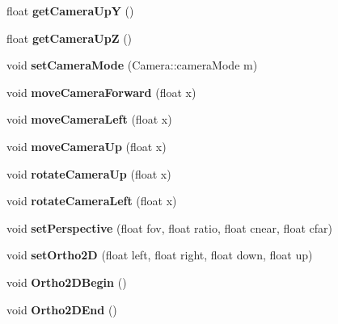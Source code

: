 \begin{DoxyCompactItemize}
\item 
\hypertarget{class_render_engine_a23f3d39a74df6bdea9f133746af82a9c}{float {\bfseries get\-Camera\-Up\-Y} ()}\label{class_render_engine_a23f3d39a74df6bdea9f133746af82a9c}

\item 
\hypertarget{class_render_engine_a0e46e46650506b8972038e032835b39b}{float {\bfseries get\-Camera\-Up\-Z} ()}\label{class_render_engine_a0e46e46650506b8972038e032835b39b}

\item 
\hypertarget{class_render_engine_a4b3a40de0970e9436210076fdfb6eda0}{void {\bfseries set\-Camera\-Mode} (Camera\-::camera\-Mode m)}\label{class_render_engine_a4b3a40de0970e9436210076fdfb6eda0}

\item 
\hypertarget{class_render_engine_a80c1ba74da94aa68ea3b262f16dbcfbe}{void {\bfseries move\-Camera\-Forward} (float x)}\label{class_render_engine_a80c1ba74da94aa68ea3b262f16dbcfbe}

\item 
\hypertarget{class_render_engine_add9933a517cc6899cc47edb376675c18}{void {\bfseries move\-Camera\-Left} (float x)}\label{class_render_engine_add9933a517cc6899cc47edb376675c18}

\item 
\hypertarget{class_render_engine_ac5708ab17601842d4c1740ffffb1efc1}{void {\bfseries move\-Camera\-Up} (float x)}\label{class_render_engine_ac5708ab17601842d4c1740ffffb1efc1}

\item 
\hypertarget{class_render_engine_ab59b72e8484098100cb81a8a10eb1f46}{void {\bfseries rotate\-Camera\-Up} (float x)}\label{class_render_engine_ab59b72e8484098100cb81a8a10eb1f46}

\item 
\hypertarget{class_render_engine_aab2507d056198b6c0a1cdce8052c8c7e}{void {\bfseries rotate\-Camera\-Left} (float x)}\label{class_render_engine_aab2507d056198b6c0a1cdce8052c8c7e}

\item 
\hypertarget{class_render_engine_ab56b031101cd39b934e8a2a1bf1bb578}{void {\bfseries set\-Perspective} (float fov, float ratio, float cnear, float cfar)}\label{class_render_engine_ab56b031101cd39b934e8a2a1bf1bb578}

\item 
\hypertarget{class_render_engine_a93628cf3d21428f0f6562727335e67fc}{void {\bfseries set\-Ortho2\-D} (float left, float right, float down, float up)}\label{class_render_engine_a93628cf3d21428f0f6562727335e67fc}

\item 
\hypertarget{class_render_engine_a17af2e852997b7d7a8f126e4223f54d2}{void {\bfseries Ortho2\-D\-Begin} ()}\label{class_render_engine_a17af2e852997b7d7a8f126e4223f54d2}

\item 
\hypertarget{class_render_engine_a20191c71cb16bd08e0052a9b3088701f}{void {\bfseries Ortho2\-D\-End} ()}\label{class_render_engine_a20191c71cb16bd08e0052a9b3088701f}

\end{DoxyCompactItemize}


